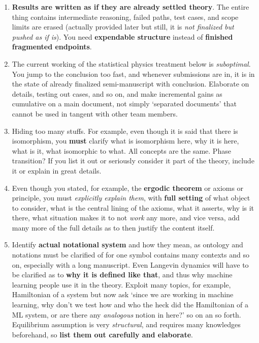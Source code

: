 \begin{enumerate}[topsep=1pt,itemsep=1pt]
    \item \textbf{Results are written as if they are already settled theory}. The entire thing contains intermediate reasoning, failed paths, test cases, and scope limits are erased (actually provided later but still, it is \textit{not finalized but pushed as if is}). You need \textbf{expendable structure} instead of \textbf{finished fragmented endpoints}. 
    \item The current working of the statistical physics treatment below is \textit{suboptimal}. You jump to the conclusion too fast, and whenever submissions are in, it is in the state of already finalized semi-manuscript with conclusion. Elaborate on details, testing out cases, and so on, and make incremental gains as cumulative on a main document, not simply `separated documents' that cannot be used in tangent with other team members. 
    \item Hiding too many stuffs. For example, even though it is said that there is isomorphism, you \textbf{must} clarify what is isomorphism here, why it is here, what is it, what isomorphic to what. All concepts are the same. Phase transition? If you list it out or seriously consider it part of the theory, include it or explain in great details. 
    \item Even though you stated, for example, the \textbf{ergodic theorem} or axioms or principle, you must \textit{explicitly explain them}, with \textbf{full setting} of what object to consider, what is the central lining of the axioms, what it asserts, why is it there, what situation makes it to not \textit{work} any more, and vice versa, add many more of the full details as to then justify the content itself. 
    \item Identify \textbf{actual notational system} and how they mean, as ontology and notations must be clarified of for one symbol contains many contexts and so on, especially with a long manuscript. Even Langevin dynamics will have to be clarified as to \textbf{why it is defined like that}, and thus why machine learning people use it in the theory. Exploit many topics, for example, Hamiltonian of a system but now ask `since we are working in machine learning, why don't we test how and who the heck did the Hamiltonian of a ML system, or are there any \textit{analogous} notion in here?' so on an so forth. Equilibrium assumption is very \textit{structural}, and requires many knowledges beforehand, so \textbf{list them out carefully and elaborate}. 
\end{enumerate}

